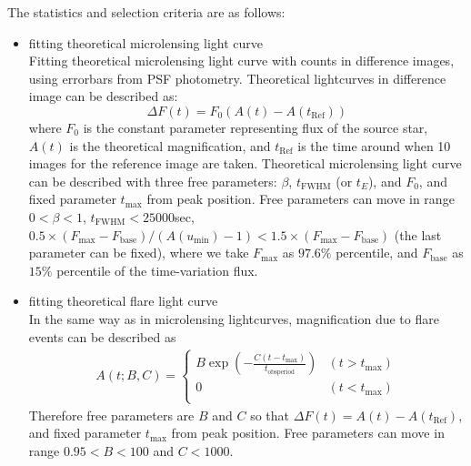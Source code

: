 \documentclass[iop, apj]{emulateapj}
\newcommand{\?}{\stackrel{?}{=}}
\begin{document}
The statistics and selection criteria are as follows:
%
\begin{itemize}
%
\item{fitting theoretical microlensing light curve}\\
Fitting theoretical microlensing light curve with counts in difference images, using errorbars from PSF photometry. 
Theoretical lightcurves in difference image can be described as:
%
\begin{equation}
\Delta F (t)= F_0 (A(t) - A(t_\mathrm{Ref}))
\label{eq:chi2dof}
\end{equation}
%
where $F_0$ is the constant parameter representing flux of the source star, 
$A(t)$ is the theoretical magnification, and  
$t_\mathrm{Ref}$ is the time around when 10 images for the reference image are taken. 
Theoretical microlensing light curve can be described %
with three free parameters: $\beta$, $t_\mathrm{FWHM}$ (or $t_E$), and $F_0$,
and fixed parameter $t_\mathrm{max}$ from peak position. 
Free parameters can move in range $0<\beta<1$, $t_\mathrm{FWHM}<25000$sec, 
$0.5 \times (F_\mathrm{max}-F_\mathrm{base})/(A(u_\mathrm{min})-1)<1.5\times (F_\mathrm{max}-F_\mathrm{base})$ 
(the last parameter can be fixed), 
where we take $F_\mathrm{max}$ as $97.6\%$ percentile, and $F_\mathrm{base}$ as $15\%$ percentile of the time-variation flux. 

\item{fitting theoretical flare light curve}\\
In the same way as in microlensing lightcurves, magnification due to flare events can be described as
%
\begin{eqnarray}
A (t;B,C)=\left\{\begin{array}{ll}
 B \exp\left(-\frac{C (t-t_\mathrm{max})}{t_\mathrm{obsperiod}}\right) & (t>t_\mathrm{max})\\
 0  & (t<t_\mathrm{max})\\
\end{array}\right.
\label{eq:expflare}
\end{eqnarray}
%
Therefore free parameters are $B$ and $C$ so that $\Delta F (t)= A(t) - A(t_\mathrm{Ref})$, %
and fixed parameter $t_\mathrm{max}$ from peak position. 
Free parameters can move in range $0.95<B<100$ and $C<1000$.  


\end{itemize}
\end{document}
